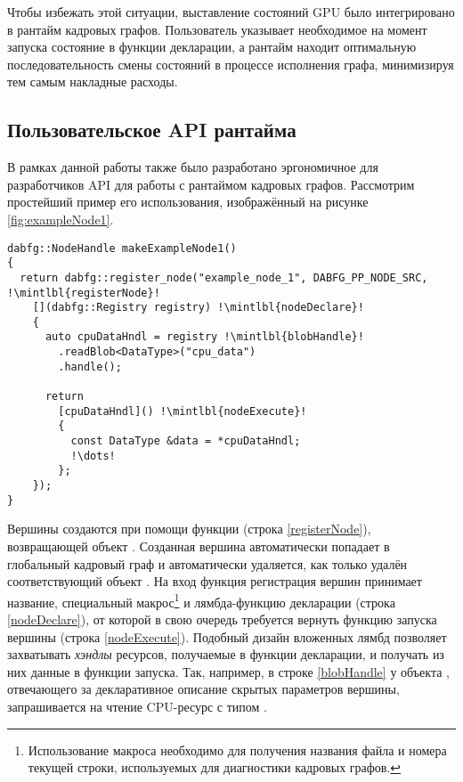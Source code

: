 Чтобы избежать этой ситуации, выставление состояний GPU было интегрировано в рантайм кадровых графов.
Пользователь указывает необходимое на момент запуска состояние в функции декларации, а рантайм находит оптимальную последовательность смены состояний в процессе исполнения графа, минимизируя тем самым накладные расходы.

\subsection{Пользовательское API рантайма}
В рамках данной работы также было разработано эргономичное для разработчиков API для работы с рантаймом кадровых графов. Рассмотрим простейший пример его использования, изображённый на рисунке \ref{fig:exampleNode1}.
\begin{figure*}
\begin{verbatim}
dabfg::NodeHandle makeExampleNode1()
{
  return dabfg::register_node("example_node_1", DABFG_PP_NODE_SRC, !\mintlbl{registerNode}!
    [](dabfg::Registry registry) !\mintlbl{nodeDeclare}!
    {
      auto cpuDataHndl = registry !\mintlbl{blobHandle}!
        .readBlob<DataType>("cpu_data")
        .handle();

      return
        [cpuDataHndl]() !\mintlbl{nodeExecute}!
        {
          const DataType &data = *cpuDataHndl;
          !\dots!
        };
    });
}
\end{verbatim}
\caption{Листинг элементарного примера использования разработанного API.}
\label{fig:exampleNode1}
\end{figure*}
Вершины создаются при помощи функции  (строка \ref{registerNode}), возвращающей объект .
Созданная вершина автоматически попадает в глобальный кадровый граф и автоматически удаляется, как только удалён соответствующий объект .
На вход функция регистрация вершин принимает название, специальный макрос\footnote{Использование макроса необходимо для получения названия файла и номера текущей строки, используемых для диагностики кадровых графов.} и лямбда-функцию декларации (строка \ref{nodeDeclare}), от которой в свою очередь требуется вернуть функцию запуска вершины (строка \ref{nodeExecute}).
Подобный дизайн вложенных лямбд позволяет захватывать \textit{хэндлы} ресурсов, получаемые в функции декларации, и получать из них данные в функции запуска.
Так, например, в строке \ref{blobHandle} у объекта , отвечающего за декларативное описание скрытых параметров вершины, запрашивается на чтение CPU-ресурс  с типом .
